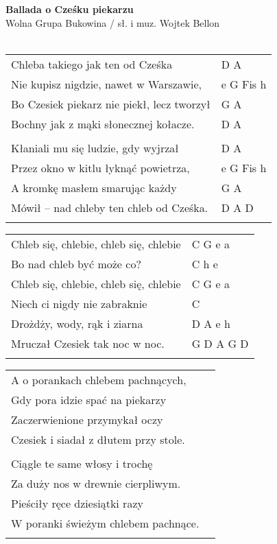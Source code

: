 \documentclass[a5paper]{article}
\begin{document}


\noindent
\fontsize{12pt}{15pt}\selectfont
\textbf{Ballada o Cześku piekarzu} \\
\fontsize{8pt}{10pt}\selectfont
Wolna Grupa Bukowina / sł. i muz. Wojtek Bellon \\ \\
\fontsize{10pt}{12pt}\selectfont
{}
\begin{tabular}{@{}p{8.5cm}p{3cm}@{}}
\noindent
Chleba takiego jak ten od Cześka & D A \\
Nie kupisz nigdzie, nawet w Warszawie, & e G Fis h \\
Bo Czesiek piekarz nie piekł, lecz tworzył & G A \\
Bochny jak z mąki słonecznej kołacze. & D A \\ \\

Kłaniali mu się ludzie, gdy wyjrzał & D A \\
Przez okno w kitlu łyknąć powietrza, & e G Fis h \\
A kromkę masłem smarując każdy & G A \\
Mówił – nad chleby ten chleb od Cześka. & D A D\\ \\
\end{tabular}

\noindent
\begin{tabular}{@{}p{7.5cm}p{3cm}@{}}
Chleb się, chlebie, chleb się, chlebie & C G e a \\
Bo nad chleb być może co? & C h e \\
Chleb się, chlebie, chleb się, chlebie & C G e a \\
Niech ci nigdy nie zabraknie & C \\
Drożdży, wody, rąk i ziarna & D A e h \\
Mruczał Czesiek tak noc w noc. & G D A G D \\ \\
\end{tabular}

\noindent
\begin{tabular}{@{}p{8.5cm}p{3cm}@{}}
A o porankach chlebem pachnących, \\
Gdy pora idzie spać na piekarzy \\
Zaczerwienione przymykał oczy \\
Czesiek i siadał z dłutem przy stole. \\ \\
 
Ciągle te same włosy i trochę \\
Za duży nos w drewnie cierpliwym. \\
Pieściły ręce dziesiątki razy \\
W poranki świeżym chlebem pachnące. \\ \\
\end{tabular}
\end{document}
